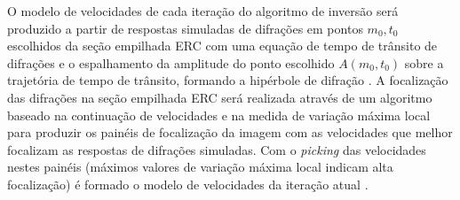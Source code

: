 O modelo de velocidades de cada iteração do algoritmo de inversão será produzido a partir de respostas simuladas
de difrações em pontos $m_0, t_0$ escolhidos da seção empilhada ERC com uma equação de tempo de trânsito de difrações
e o espalhamento da amplitude do ponto escolhido $A(m_0, t_0)$ sobre a trajetória de tempo de trânsito, formando
a hipérbole de difração \cite{diffractions}. A focalização das difrações na seção empilhada ERC será realizada
através de um algoritmo baseado na continuação de velocidades e na medida de variação máxima local para produzir
os painéis de focalização da imagem com as velocidades que melhor focalizam as respostas de difrações simuladas.
Com o \textit{picking} das velocidades nestes painéis (máximos valores de variação máxima local indicam alta focalização)
é formado o modelo de velocidades da iteração atual \cite{sep_dif}.




